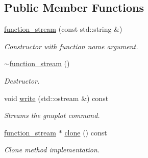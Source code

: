 \subsection*{Public Member Functions}
\begin{DoxyCompactItemize}
\item 
\hypertarget{a00235_a59de7b5974ccfe0fb665f35e7e956798}{}\hyperlink{a00235_a59de7b5974ccfe0fb665f35e7e956798}{function\+\_\+stream} (const std\+::string \&)\label{a00235_a59de7b5974ccfe0fb665f35e7e956798}

\begin{DoxyCompactList}\small\item\em Constructor with function name argument. \end{DoxyCompactList}\item 
\hypertarget{a00235_a7637a1801230e828c7615b6db0747cb9}{}\hyperlink{a00235_a7637a1801230e828c7615b6db0747cb9}{$\sim$function\+\_\+stream} ()\label{a00235_a7637a1801230e828c7615b6db0747cb9}

\begin{DoxyCompactList}\small\item\em Destructor. \end{DoxyCompactList}\item 
\hypertarget{a00235_aed0bf015c8f2f762f979c629698c968c}{}void \hyperlink{a00235_aed0bf015c8f2f762f979c629698c968c}{write} (std\+::ostream \&) const \label{a00235_aed0bf015c8f2f762f979c629698c968c}

\begin{DoxyCompactList}\small\item\em Streams the gnuplot command. \end{DoxyCompactList}\item 
\hypertarget{a00235_a69ee3b0afcaafeb0958aee52d0c82f39}{}\hyperlink{a00235}{function\+\_\+stream} $\ast$ \hyperlink{a00235_a69ee3b0afcaafeb0958aee52d0c82f39}{clone} () const \label{a00235_a69ee3b0afcaafeb0958aee52d0c82f39}

\begin{DoxyCompactList}\small\item\em Clone method implementation. \end{DoxyCompactList}\end{DoxyCompactItemize}
